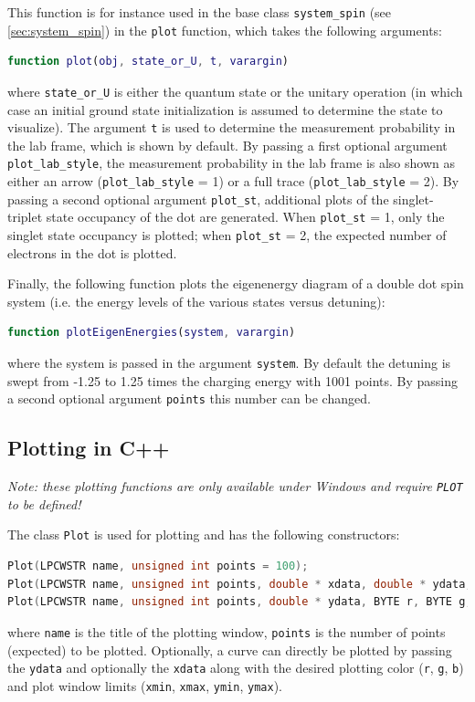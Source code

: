 \documentclass[10pt,a4paper,onecolumn,notitlepage]{article}
\begin{document}
This function is for instance used in the base class \lstinline{system_spin} (see \cref{sec:system_spin}) in the \lstinline{plot} function, which takes the following arguments:
\begin{lstlisting}[language=MATLAB]
function plot(obj, state_or_U, t, varargin)
\end{lstlisting}
where \lstinline{state_or_U} is either the quantum state or the unitary operation (in which case an initial ground state initialization is assumed to determine the state to visualize). The argument \lstinline{t} is used to determine the measurement probability in the lab frame, which is shown by default. By passing a first optional argument \lstinline{plot_lab_style}, the measurement probability in the lab frame is also shown as either an arrow (\lstinline{plot_lab_style} = 1) or a full trace (\lstinline{plot_lab_style} = 2). By passing a second optional argument \lstinline{plot_st}, additional plots of the singlet-triplet state occupancy of the dot are generated. When \lstinline{plot_st} = 1, only the singlet state occupancy is plotted; when \lstinline{plot_st} = 2, the expected number of electrons in the dot is plotted.

Finally, the following function plots the eigenenergy diagram of a double dot spin system (i.e. the energy levels of the various states versus detuning):
\begin{lstlisting}[language=MATLAB]
function plotEigenEnergies(system, varargin)
\end{lstlisting}
where the system is passed in the argument \lstinline{system}. By default the detuning is swept from -1.25 to 1.25 times the charging energy with 1001 points. By passing a second optional argument \lstinline{points} this number can be changed.

\subsection{Plotting in C++}
\emph{Note: these plotting functions are only available under Windows and require \lstinline{PLOT} to be defined!}

The class \lstinline{Plot} is used for plotting and has the following constructors:
\begin{lstlisting}[language=C++]
Plot(LPCWSTR name, unsigned int points = 100);
Plot(LPCWSTR name, unsigned int points, double * xdata, double * ydata, BYTE r, BYTE g, BYTE b, double xmin, double xmax, double ymin, double ymax);
Plot(LPCWSTR name, unsigned int points, double * ydata, BYTE r, BYTE g, BYTE b, double xmin, double xmax, double ymin, double ymax);
\end{lstlisting}
where \lstinline{name} is the title of the plotting window, \lstinline{points} is the number of points (expected) to be plotted. Optionally, a curve can directly be plotted by passing the \lstinline{ydata} and optionally the \lstinline{xdata} along with the desired plotting color (\lstinline{r}, \lstinline{g}, \lstinline{b}) and plot window limits (\lstinline{xmin}, \lstinline{xmax}, \lstinline{ymin}, \lstinline{ymax}).
\end{document}

